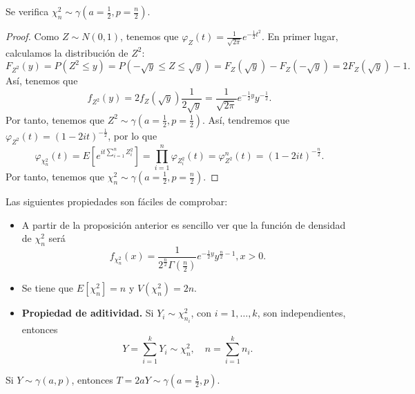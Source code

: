 \begin{prop}
Se verifica $\displaystyle \chi_{n}^{2} \sim \gamma\left(a = \frac{1}{2}, p = \frac{n}{2}\right) $. 
\end{prop}
\begin{proof}
Como $\displaystyle Z \sim N\left(0,1\right) $, tenemos que $\displaystyle \varphi_{Z}\left(t\right)=\frac{1}{\sqrt{2\pi }}e^{-\frac{1}{2}t ^{2}} $. En primer lugar, calculamos la distribución de $\displaystyle Z^{2} $:
\[F_{Z^{2}}\left(y\right)=P\left(Z^{2} \leq y\right) = P\left(-\sqrt{y} \leq Z \leq \sqrt{y} \right) = F_{Z}\left(\sqrt{y}\right)-F_{Z}\left(-\sqrt{y}\right) = 2F_{Z}\left(\sqrt{y}\right)-1.\]
Así, tenemos que 
\[f_{Z^{2}}\left(y\right)=2f_{Z}\left(\sqrt{y}\right)\frac{1}{2\sqrt{y}}=\frac{1}{\sqrt{2\pi }}e^{-\frac{1}{2}y}y^{-\frac{1}{2}} .\]
Por tanto, tenemos que $\displaystyle Z^{2} \sim \gamma \left(a = \frac{1}{2}, p = \frac{1}{2}\right) $. Así, tendremos que $\displaystyle \varphi_{Z^{2}}\left(t\right)=\left(1-2it\right)^{-\frac{1}{2}} $, por lo que 
\[\varphi_{\chi_{n}^{2}}\left(t\right)=E\left[e^{it\sum^{n}_{i = 1}Z_{i}^{2}}\right] = \prod^{n}_{i = 1}\varphi_{Z_{i}^{2}}\left(t\right)=\varphi_{Z^{2}}^{n}\left(t\right) = \left(1 - 2it\right)^{-\frac{n}{2}} .\]
Por tanto, tenemos que $\displaystyle \chi_{n}^{2} \sim \gamma\left(a = \frac{1}{2}, p = \frac{n}{2}\right) $. 
\end{proof}
\begin{observation} Las siguientes propiedades son fáciles de comprobar:
	\begin{itemize}
	\item A partir de la proposición anterior es sencillo ver que la función de densidad de $\displaystyle \chi_{n}^{2} $ será
\[f_{\chi_{n}^{2}}\left(x\right)=\frac{1}{2^{\frac{n}{2}}\Gamma\left(\frac{n}{2}\right)}e^{-\frac{1}{2}y}y^{\frac{n}{2}-1}, x > 0 .\]
\item Se tiene que $\displaystyle E\left[\chi_{n}^{2}\right] =n $ y $\displaystyle V\left(\chi_{n}^{2}\right)=2n $.
\item \textbf{Propiedad de aditividad.} Si $\displaystyle Y_{i} \sim \chi_{n_{i}}^{2} $, con $\displaystyle i = 1, \ldots, k $, son independientes, entonces
	\[Y = \sum^{k}_{i = 1}Y_{i} \sim \chi_{n}^{2}, \quad n = \sum^{k}_{i=1}n_{i} .\]
	\end{itemize} 
\end{observation}
\begin{lema}
Si $\displaystyle Y \sim \gamma\left(a,p\right) $, entonces $\displaystyle T = 2aY \sim \gamma\left(a = \frac{1}{2}, p\right) $. 
\end{lema}

